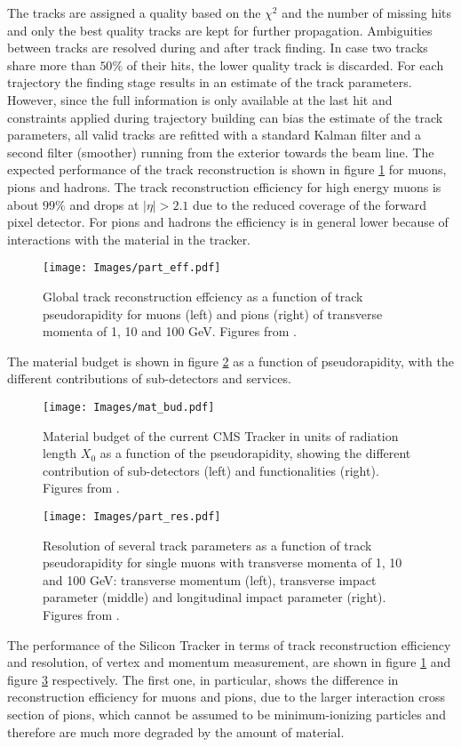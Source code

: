 The tracks are assigned a quality based on the $\chi^2$ and the number of missing
hits and only the best quality tracks are kept for further propagation. Ambiguities
between tracks are resolved during and after track finding. In case two tracks share
more than $50\%$ of their hits, the lower quality track is discarded. For each trajectory 
the finding stage results in an estimate of the track parameters. However,
since the full information is only available at the last hit and constraints applied
during trajectory building can bias the estimate of the track parameters, all valid
tracks are refitted with a standard Kalman filter and a second filter (smoother)
running from the exterior towards the beam line. The expected performance of
the track reconstruction is shown in figure \ref{part_eff} for muons, pions and hadrons. The
track reconstruction efficiency for high energy muons is about $99\%$ and drops at
$|\eta|>2.1$ due to the reduced coverage of the forward pixel detector. For pions and
hadrons the efficiency is in general lower because of interactions with the material
in the tracker.
\begin{figure}
\centering
\texttt{[image: Images/part\_eff.pdf]}
\caption{Global track reconstruction effciency as a function of track pseudorapidity 
for muons (left) and pions (right) of transverse momenta of 1, 10 and 100
GeV. Figures from \cite{CMS}.}
\label{part_eff}
\end{figure}

The material budget is shown in figure \ref{mat_bud} as a function of pseudorapidity,
with the different contributions of sub-detectors and services.
\begin{figure}
\centering
\texttt{[image: Images/mat\_bud.pdf]}
\caption{Material budget of the current CMS Tracker in units of radiation
length $X_0$ as a function of the pseudorapidity, showing the different contribution
of sub-detectors (left) and functionalities (right). Figures from \cite{CMS}.}
\label{mat_bud}
\end{figure}

\begin{figure}
\centering
\texttt{[image: Images/part\_res.pdf]}
\caption{Resolution of several track parameters as a function of track pseudorapidity 
for single muons with transverse momenta of 1, 10 and 100 GeV: transverse
momentum (left), transverse impact parameter (middle) and longitudinal impact
parameter (right). Figures from \cite{CMS}.}
\label{part_res}
\end{figure}
The performance of the Silicon Tracker in terms of track reconstruction efficiency 
and resolution, of vertex and momentum measurement, are shown in figure \ref{part_eff}
and figure \ref{part_res} respectively. The first one, in particular, shows the difference in reconstruction 
efficiency for muons and pions, due to the larger interaction cross section
of pions, which cannot be assumed to be minimum-ionizing particles and therefore
are much more degraded by the amount of material.

